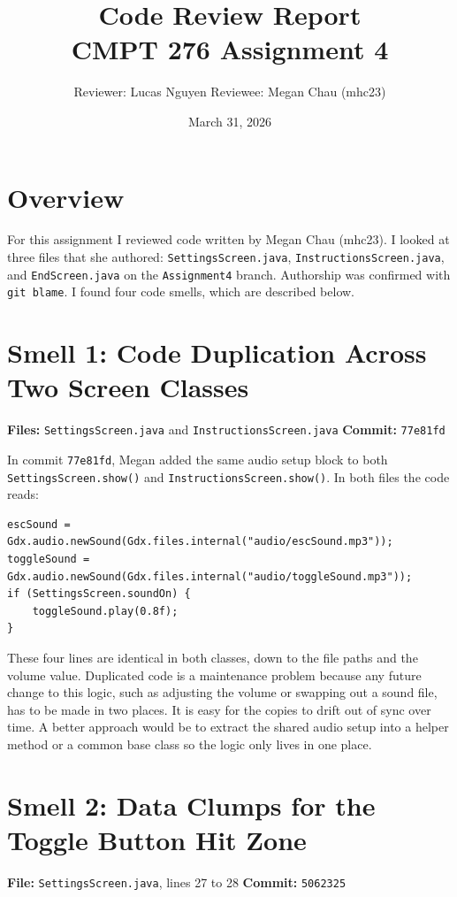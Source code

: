 \documentclass[10pt]{article}
\title{\textbf{Code Review Report} \\[4pt]
\large CMPT 276 \quad Assignment 4}
\author{Reviewer: Lucas Nguyen \quad Reviewee: Megan Chau (mhc23)}
\date{March 31, 2026}
\begin{document}
\maketitle

\section*{Overview}

For this assignment I reviewed code written by Megan Chau (mhc23).
I looked at three files that she authored: \texttt{SettingsScreen.java},
\texttt{InstructionsScreen.java}, and \texttt{EndScreen.java} on the
\texttt{Assignment4} branch. Authorship was confirmed with \texttt{git blame}.
I found four code smells, which are described below.

\section{Smell 1: Code Duplication Across Two Screen Classes}

\textbf{Files:} \texttt{SettingsScreen.java} and \texttt{InstructionsScreen.java} \quad
\textbf{Commit:} \texttt{77e81fd}

In commit \texttt{77e81fd}, Megan added the same audio setup block to both
\texttt{SettingsScreen.show()} and \texttt{InstructionsScreen.show()}.
In both files the code reads:

\begin{lstlisting}
escSound = Gdx.audio.newSound(Gdx.files.internal("audio/escSound.mp3"));
toggleSound = Gdx.audio.newSound(Gdx.files.internal("audio/toggleSound.mp3"));
if (SettingsScreen.soundOn) {
    toggleSound.play(0.8f);
}
\end{lstlisting}

These four lines are identical in both classes, down to the file paths and the
volume value. Duplicated code is a maintenance problem because any future
change to this logic, such as adjusting the volume or swapping out a sound file,
has to be made in two places. It is easy for the copies to drift out of sync
over time. A better approach would be to extract the shared audio setup into a
helper method or a common base class so the logic only lives in one place.

\section{Smell 2: Data Clumps for the Toggle Button Hit Zone}

\textbf{File:} \texttt{SettingsScreen.java}, lines 27 to 28 \quad
\textbf{Commit:} \texttt{5062325}
\end{document}
